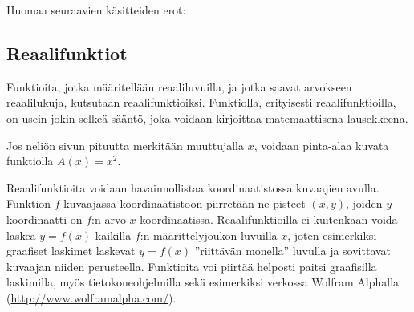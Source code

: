 Huomaa seuraavien käsitteiden erot:

\subsection*{Reaalifunktiot}

Funktioita, jotka määritellään reaaliluvuilla, ja jotka saavat arvokseen reaalilukuja, kutsutaan reaalifunktioiksi.
Funktiolla, erityisesti reaalifunktioilla, on usein jokin selkeä sääntö, joka voidaan kirjoittaa matemaattisena lausekkeena.

\begin{esimerkki}
	Jos neliön sivun pituutta merkitään muuttujalla $x$, voidaan pinta-alaa kuvata funktiolla $A(x) = x^2$.
\end{esimerkki} 

Reaalifunktioita voidaan havainnollistaa koordinaatistossa kuvaajien avulla.
Funktion $f$ kuvaajassa koordinaatistoon piirretään ne pisteet $(x, y)$, joiden $y$-koordinaatti on $f$:n arvo $x$-koordinaatissa.
Reaalifunktioilla ei kuitenkaan voida laskea $y = f(x)$ kaikilla $f$:n määrittelyjoukon luvuilla $x$, joten esimerkiksi graafiset laskimet
laskevat $y = f(x)$ ''riittävän monella'' luvulla ja sovittavat kuvaajan niiden perusteella.
Funktioita voi piirtää helposti paitsi graafisilla laskimilla, myös tietokoneohjelmilla sekä esimerkiksi verkossa
Wolfram Alphalla (\url{http://www.wolframalpha.com/}).

\def\vcent#1{\mathsurround0pt$\vcenter{\hbox{#1}}$}


